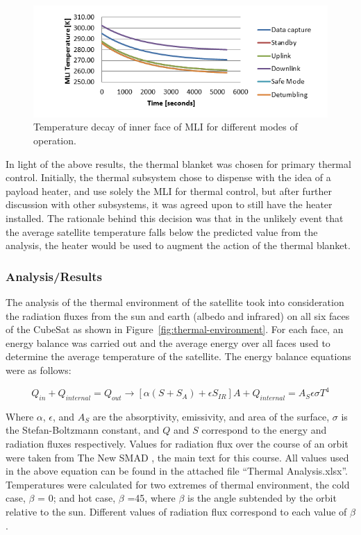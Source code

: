 \documentclass[12pt]{article}
\begin{document}
\begin{figure}[ht]%
\centering
\includegraphics{images/thermal-decay}%
\caption{Temperature decay of inner face of MLI for different modes of operation.}%
\label{fig:thermal-decay}%
\end{figure}

In light of the above results, the thermal blanket was chosen for primary thermal control. Initially, the thermal subsystem chose to dispense with the idea of a payload heater, and use solely the MLI for thermal control, but after further discussion with other subsystems, it was agreed upon to still have the heater installed. The rationale behind this decision was that in the unlikely event that the average satellite temperature falls below the predicted value from the analysis, the heater would be used to augment the action of the thermal blanket. 

\subsubsection{Analysis/Results} \label{sec:thermal-analysis}

The analysis of the thermal environment of the satellite took into consideration the radiation fluxes from the sun and earth (albedo and infrared) on all six faces of the CubeSat as shown in Figure~\ref{fig:thermal-environment}. For each face, an energy balance was carried out and the average energy over all faces used to determine the average temperature of the satellite. The energy balance equations were as follows:

\begin{equation}
Q_{in} + Q_{internal} = Q_{out} \rightarrow [\alpha(S + S_A) + \epsilon S_{IR}] A + Q_{internal} = A_S \epsilon \sigma T^4
\label{eq:thermal-balance}
\end{equation}

Where $\alpha$, $\epsilon$, and $A_S$ are the absorptivity, emissivity, and area of the surface, $\sigma$ is the Stefan-Boltzmann constant, and $Q$ and $S$ correspond to the energy and radiation fluxes respectively. Values for radiation flux over the course of an orbit were taken from The New SMAD \cite[p.~688,~table~22-11]{SMAD}, the main text for this course.  All values used in the above equation can be found in the attached file ``Thermal Analysis.xlsx''.  Temperatures were calculated for two extremes of thermal environment, the cold case, $\beta$ = 0; and hot case, $\beta$ =45, where $\beta$ is the angle subtended by the orbit relative to the sun.  Different values of radiation flux correspond to each value of $\beta$.
\end{document}
